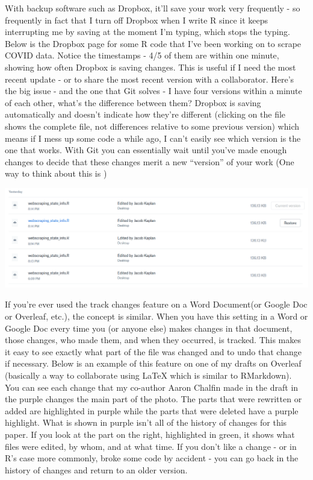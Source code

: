 \documentclass[
]{krantz}
\begin{document}
With backup software such as Dropbox, it'll save your work very frequently - so frequently in fact that I turn off Dropbox when I write R since it keeps interrupting me by saving at the moment I'm typing, which stops the typing. Below is the Dropbox page for some R code that I've been working on to scrape COVID data. Notice the timestamps - 4/5 of them are within one minute, showing how often Dropbox is saving changes. This is useful if I need the most recent update - or to share the most recent version with a collaborator. Here's the big issue - and the one that Git solves - I have four versions within a minute of each other, what's the difference between them? Dropbox is saving automatically and doesn't indicate how they're different (clicking on the file shows the complete file, not differences relative to some previous version) which means if I mess up some code a while ago, I can't easily see which version is the one that works. With Git you can essentially wait until you've made enough changes to decide that these changes merit a new ``version'' of your work (One way to think about this is )

\includegraphics{images/dropbox.png}

If you're ever used the track changes feature on a Word Document(or Google Doc or Overleaf, etc.), the concept is similar. When you have this setting in a Word or Google Doc every time you (or anyone else) makes changes in that document, those changes, who made them, and when they occurred, is tracked. This makes it easy to see exactly what part of the file was changed and to undo that change if necessary. Below is an example of this feature on one of my drafts on Overleaf (basically a way to collaborate using LaTeX which is similar to RMarkdown). You can see each change that my co-author Aaron Chalfin made in the draft in the purple changes the main part of the photo. The parts that were rewritten or added are highlighted in purple while the parts that were deleted have a purple highlight. What is shown in purple isn't all of the history of changes for this paper. If you look at the part on the right, highlighted in green, it shows what files were edited, by whom, and at what time. If you don't like a change - or in R's case more commonly, broke some code by accident - you can go back in the history of changes and return to an older version.
\end{document}
